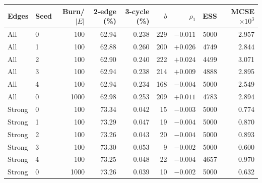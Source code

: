 \begin{tabular}{llrrrr@{\hspace{1.2em}}rrr}
\toprule
Edges & Seed & Burn/$|E|$ & 2-edge (\%) & 3-cycle (\%) & $b$ & $\rho_1$ & ESS & MCSE $\times10^3$ \\
\midrule
All & 0 & 100 & 62.94 & 0.238 & 229 & $-0.011$ & 5000 & 2.957 \\
All & 1 & 100 & 62.88 & 0.260 & 200 & $+0.026$ & 4749 & 2.844 \\
All & 2 & 100 & 62.90 & 0.240 & 222 & $+0.024$ & 4499 & 3.071 \\
All & 3 & 100 & 62.94 & 0.238 & 214 & $+0.009$ & 4888 & 2.895 \\
All & 4 & 100 & 62.94 & 0.234 & 168 & $-0.004$ & 5000 & 2.549 \\
All & 0 & 1000 & 62.98 & 0.253 & 209 & $+0.011$ & 4783 & 2.894 \\
\midrule
Strong & 0 & 100 & 73.34 & 0.042 & 15 & $-0.003$ & 5000 & 0.774 \\
Strong & 1 & 100 & 73.29 & 0.047 & 19 & $-0.004$ & 5000 & 0.870 \\
Strong & 2 & 100 & 73.26 & 0.043 & 20 & $-0.004$ & 5000 & 0.893 \\
Strong & 3 & 100 & 73.30 & 0.053 & 9 & $-0.002$ & 5000 & 0.600 \\
Strong & 4 & 100 & 73.25 & 0.048 & 22 & $-0.004$ & 4657 & 0.970 \\
Strong & 0 & 1000 & 73.26 & 0.039 & 10 & $-0.002$ & 5000 & 0.632 \\
\bottomrule
\end{tabular}
